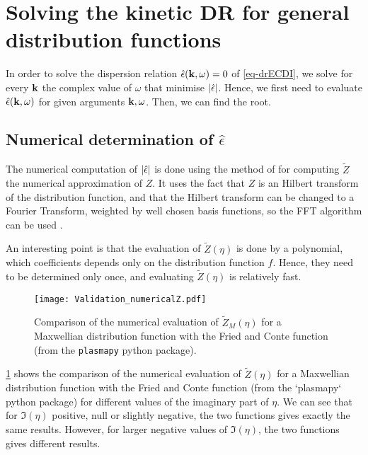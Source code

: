 
\section{Solving the kinetic \ac{DR} for general distribution functions}
  \label{sec-DR-solver}
  \renewcommand\rightmark{\expandafter\MakeUppercase{Solver for the general DR}}


  In order to solve the dispersion relation $\hat\epsilon({\mathbf k}, \omega) = 0$ of \cref{eq-drECDI}, we solve for every ${\mathbf k}$ the complex value of $\omega$ that minimise $\lvert\hat\epsilon\rvert$.
  Hence, we first need to evaluate $\hat\epsilon({\mathbf k}, \omega)$ for given arguments ${\mathbf k}, \omega$.
  Then, we can find the root.
  
  \subsection{Numerical determination of $\hat\epsilon$} \label{subsec-numepsilon}
  
  The numerical computation of $\lvert\hat\epsilon\rvert$ is done using the method of \citet{xie2013} for computing $\tilde{Z}$ the numerical approximation of $Z$. 
  It uses the fact that $Z$ is an Hilbert transform of the distribution function, and that the Hilbert transform can be changed to a Fourier Transform, weighted by well chosen basis functions, so the \ac{FFT} algorithm can be used \citep{weideman1995}.
  
  An interesting point is that the evaluation of $\tilde{Z}(\eta)$ is done by a polynomial, which coefficients depends only on the distribution function $f$. 
  Hence, they need to be determined only once, and evaluating $\tilde{Z}(\eta)$ is relatively fast.
  
  \begin{figure}[hbt]
    \centering
    \texttt{[image: Validation\_numericalZ.pdf]}
    \caption{Comparison of the numerical evaluation of $\tilde{Z}_M(\eta)$ for a Maxwellian distribution function with the Fried and Conte function (from the \texttt{plasmapy} python package).  }
    \label{fig-numZ}
  \end{figure}
  \cref{fig-numZ} shows the comparison of the numerical evaluation of $\tilde{Z}(\eta)$ for a Maxwellian distribution function with the Fried and Conte function (from the `plasmapy` python package) for different values of the imaginary part of $\eta$.
  We can see that for $\Im(\eta)$ positive, null or slightly negative, the two functions gives exactly the same results.
  However, for larger negative values of $\Im(\eta)$, the two functions gives different results.
  
